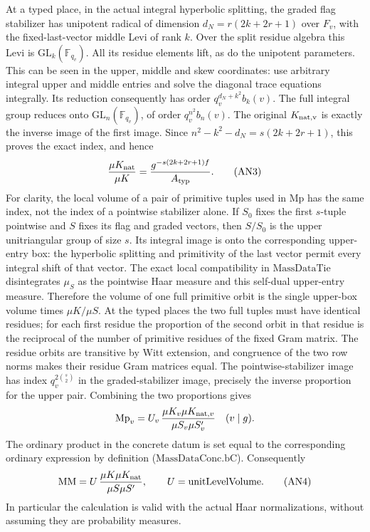 At a typed place, in the actual integral hyperbolic splitting,
the graded flag stabilizer has unipotent radical of dimension
\(d_N=r(2k+2r+1)\) over \(F_v\), with the fixed-last-vector
middle Levi of rank \(k\). Over the split residue algebra this
Levi is \(\mathrm{GL}_k(\mathbb F_{q_v})\). All its residue
elements lift, as do the unipotent parameters. This can be seen
in the upper, middle and skew coordinates: use arbitrary integral
upper and middle entries and solve the diagonal trace equations
integrally. Its reduction consequently has order
\(q_v^{d_N+k^2}b_k(v)\). The full integral group reduces onto
\(\mathrm{GL}_n(\mathbb F_{q_v})\), of order \(q_v^{n^2}b_n(v)\).
The original \(K_{\rm nat,v}\) is exactly the inverse image of
the first image. Since \(n^2-k^2-d_N=s(2k+2r+1)\), this proves
the exact index, and hence
\[
        \frac{\mu K_{\rm nat}}{\mu K}
          =\frac{g^{-s(2k+2r+1)f}}{A_{\rm typ}}.         \tag{AN3}
\]
For clarity, the local volume of a pair of primitive tuples
used in \(\mathrm{Mp}\) has the same index, not the index
of a pointwise stabilizer alone. If \(S_0\) fixes the first
\(s\)-tuple pointwise and \(S\) fixes its flag and graded
vectors, then \(S/S_0\) is the upper unitriangular group of
size \(s\). Its integral image is onto the corresponding
upper-entry box: the hyperbolic splitting and primitivity of
the last vector permit every integral shift of that vector.
The exact local compatibility in \(\mathrm{MassDataTie}\)
disintegrates \(\mu_S\) as the pointwise Haar measure and
this self-dual upper-entry measure. Therefore the volume of
one full primitive orbit is the single upper-box volume
times \(\mu K/\mu S\). At the typed places the two full
tuples must have identical residues; for each first residue
the proportion of the second orbit in that residue is
the reciprocal of the number of primitive residues of the
fixed Gram matrix. The residue orbits are transitive by Witt
extension, and congruence of the two row norms makes their
residue Gram matrices equal. The pointwise-stabilizer image
has index \(q_v^{2\binom{s}{2}}\) in the graded-stabilizer
image, precisely the inverse proportion for the upper pair.
Combining the two proportions gives
\[
   \mathrm{Mp}_v
       =U_v\,\frac{\mu K_v\mu K_{{\rm nat},v}}
                        {\mu S_v\mu S'_v}\quad(v\mid g).
\]
The ordinary product in the concrete datum is set equal to
the corresponding ordinary expression by definition
(\(\mathrm{MassDataConc.bC}\)). Consequently
\[
       \mathrm{MM}=U\,\frac{\mu K\mu K_{\rm nat}}{\mu S\mu S'},
       \qquad U=\mathrm{unitLevelVolume}.              \tag{AN4}
\]
In particular the calculation is valid with the actual Haar
normalizations, without assuming they are probability measures.

